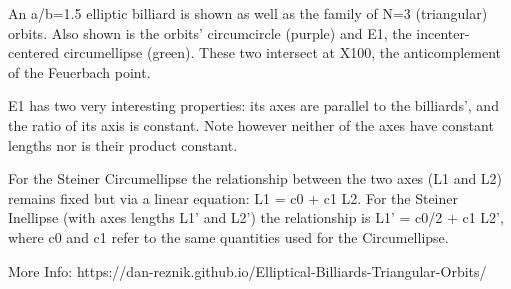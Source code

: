 An a/b=1.5 elliptic billiard is shown as well as the family of N=3 (triangular) orbits. Also shown is the orbits' circumcircle (purple) and E1, the incenter-centered circumellipse (green). These two intersect at X100, the anticomplement of the Feuerbach point.

E1 has two very interesting properties: its axes are parallel to the billiards', and the ratio of its axis is constant. Note however neither of the axes have constant lengths nor is their product constant.

For the Steiner Circumellipse the relationship between the two axes (L1 and L2) remains fixed but via a linear equation: L1 = c0 + c1 L2. For the Steiner Inellipse (with axes lengths L1' and L2') the relationship is L1' = c0/2 + c1 L2', where c0 and c1 refer to the same quantities used for the Circumellipse.

More Info: https://dan-reznik.github.io/Elliptical-Billiards-Triangular-Orbits/